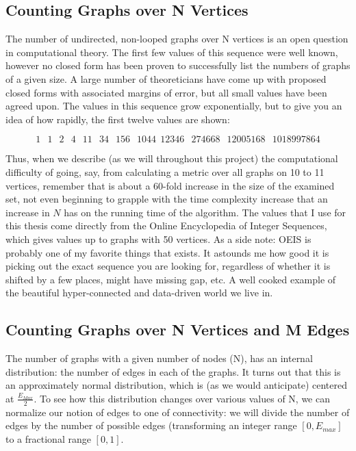 \subsection{Counting Graphs over N Vertices}

The number of undirected, non-looped graphs over N vertices is an open question in computational theory.
The first few values of this sequence were well known, however no closed form has been proven to successfully list the numbers of graphs of a given size.
A large number of theoreticians have come up with proposed closed forms with associated margins of error, but all small values have been agreed upon.
The values in this sequence grow exponentially, but to give you an idea of how rapidly, the first twelve values are shown:

$$1\,\; \;1\, \;\;2\, \;\;4\, \;\;11\, \;\;34\, \;\;156\, \;\;1044\,\; 12346\,\;\; 274668\, \;\;12005168\, \;\;1018997864$$

Thus, when we describe (as we will throughout this project) the computational difficulty of going, say, from calculating a metric over all graphs on 10 to 11 vertices, remember that is about a 60-fold increase in the size of the examined set, not even beginning to grapple with the time complexity increase that an increase in $N$ has on the running time of the algorithm.
The values that I use for this thesis come directly from the Online Encyclopedia of Integer Sequences, which gives values up to graphs with 50 vertices.
As a side note: OEIS is probably one of my favorite things that exists.
It astounds me how good it is picking out the exact sequence you are looking for, regardless of whether it is shifted by a few places, might have missing gap, etc.
A well cooked example of the beautiful hyper-connected and data-driven world we live in.

\subsection{Counting Graphs over N Vertices and M Edges}

The number of graphs with a given number of nodes (N), has an internal distribution: the number of edges in each of the graphs.
It turns out that this is an approximately normal distribution, which is (as we would anticipate) centered at $\frac{E_{Max}}{2}$. 
To see how this distribution changes over various values of N, we can normalize our notion of edges to one of connectivity:
we will divide the number of edges by the number of possible edges (transforming an integer range $[0, E_{max}]$ to a fractional range $[0, 1]$.

